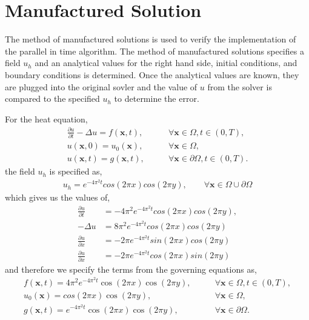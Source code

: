 \documentclass{article}
\begin{document}
\section{Manufactured Solution}
\label{sec:MFGSol}

The method of manufactured solutions is used to verify the implementation of the
parallel in time algorithm.
The method of manufactured solutions specifies a field $u_h$ and an
analytical values for the right hand side, initial conditions, and boundary
conditions is determined.
Once the analytical values are known, they are plugged into the original sovler
and the value of $u$ from the solver is compared to the specified $u_h$ to
determine the error.

For the heat equation,
\begin{align*}
  \frac{\partial u}{\partial t} - \Delta u = f(\boldsymbol{x},t), \qquad &\forall\boldsymbol{x}\in\Omega,t\in\left( 0,T \right), \\
  u(\boldsymbol{x},0) = u_0(\boldsymbol{x}), \qquad &\forall \boldsymbol{x}\in\Omega, \\
  u(\boldsymbol{x},t) = g(\boldsymbol{x},t), \qquad &\forall \boldsymbol{x}\in\partial\Omega,t\in\left( 0,T \right).
\end{align*}
the field $u_h$ is specified as,
\begin{align*}
  u_h = e^{-4\pi^2t}cos(2 \pi x)cos(2 \pi y), \qquad \forall \boldsymbol{x} \in \Omega \cup \partial\Omega
\end{align*}
which gives us the values of,
\begin{align*}
  \frac{\partial u}{\partial t} &= -4 \pi^2 e^{-4\pi^2t}cos(2 \pi x)cos(2 \pi y), \\
  -\Delta u &= 8 \pi^2 e^{-4\pi^2t}cos(2 \pi x)cos(2 \pi y) \\
  \frac{\partial u}{\partial x} &= -2 \pi e^{-4\pi^2t}sin(2\pi x)cos(2\pi y) \\
  \frac{\partial u}{\partial x} &= -2 \pi e^{-4\pi^2t}cos(2\pi x)sin(2\pi y)
\end{align*}
and therefore we specify the terms from the governing equations as,
\begin{align*}
  f(\boldsymbol{x},t) = 4 \pi^2 e^{-4\pi^2t}\cos(2 \pi x)\cos(2 \pi y), \qquad&\forall\boldsymbol{x}\in\Omega,t\in\left( 0,T \right), \\
  u_0(\boldsymbol{x}) = cos(2 \pi x)\cos(2 \pi y), \qquad &\forall \boldsymbol{x}\in\Omega, \\
  g(\boldsymbol{x},t) = e^{-4\pi^2t}\cos(2 \pi x)\cos(2 \pi y), \qquad &\forall \boldsymbol{x} \in \partial\Omega.
\end{align*}
\end{document}
